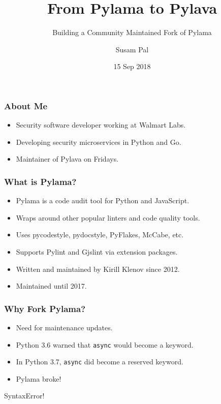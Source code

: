 \documentclass{beamer}
\title{From Pylama to Pylava}
\subtitle{\vspace{2mm} Building a Community Maintained Fork of Pylama}
\author{Susam Pal}
\institute[PyCon UK 2018, Cardiff, UK]{
    PyCon UK 2018, Cardiff City Hall, Cardiff, UK
}
\date{15 Sep 2018}
\newcommand{\inlinecode}[1]{
    \colorbox{black!10}{%
        \texttt{#1}%
    }
}
\begin{document}
\frame{\titlepage}


\begin{frame}
    \frametitle{About Me}

    \begin{itemize}
        \item Security software developer working at Walmart Labs.
        \item Developing security microservices in Python and Go.
        \item Maintainer of Pylava on Fridays.
    \end{itemize}
\end{frame}


\begin{frame}
    \frametitle{What is Pylama?}
    \begin{itemize}
        \item Pylama is a code audit tool for Python and JavaScript.
        \item Wraps around other popular linters and code quality tools.
        \item Uses pycodestyle, pydocstyle, PyFlakes, McCabe, etc.
        \item Supports Pylint and Gjslint via extension packages.
        \item Written and maintained by Kirill Klenov since 2012.
        \item Maintained until 2017.
    \end{itemize}
\end{frame}


\begin{frame}[fragile]
    \frametitle{Why Fork Pylama?}

    \begin{itemize}
        \item
        Need for maintenance updates.
        \item
        Python 3.6 warned that \inlinecode{async} would become a
        keyword.
        \item
        In Python 3.7, \inlinecode{async} did become a reserved keyword.
        \item
        Pylama broke!
    \end{itemize}
    
    \begin{block}{SyntaxError!}
    \end{block}
\end{frame}
\end{document}
